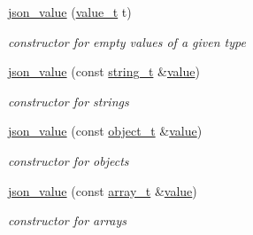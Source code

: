 \begin{DoxyCompactItemize}
\hyperlink{unionnlohmann_1_1basic__json_1_1json__value_a5c2646f7b0007e90ecbf111f2967f7dc}{json\+\_\+value} (\hyperlink{classnlohmann_1_1basic__json_a231b02148577b69a154b2ce2c87a5522}{value\+\_\+t} t)
\begin{DoxyCompactList}\small\item\em constructor for empty values of a given type \end{DoxyCompactList}\item 
\hyperlink{unionnlohmann_1_1basic__json_1_1json__value_a6f4d4d8cce00e9e39980a5d0c6d49565}{json\+\_\+value} (const \hyperlink{classnlohmann_1_1basic__json_ab63e618bbb0371042b1bec17f5891f42}{string\+\_\+t} \&\hyperlink{classnlohmann_1_1basic__json_a0a2cbbd95862a623e7dc5c37e67dead0}{value})
\begin{DoxyCompactList}\small\item\em constructor for strings \end{DoxyCompactList}\item 
\hyperlink{unionnlohmann_1_1basic__json_1_1json__value_ad2de23d77c9f7110149adeb0e10145fe}{json\+\_\+value} (const \hyperlink{classnlohmann_1_1basic__json_a0ac9894c9de8dc551cf2e5f1c605537f}{object\+\_\+t} \&\hyperlink{classnlohmann_1_1basic__json_a0a2cbbd95862a623e7dc5c37e67dead0}{value})
\begin{DoxyCompactList}\small\item\em constructor for objects \end{DoxyCompactList}\item 
\hyperlink{unionnlohmann_1_1basic__json_1_1json__value_a456755d536c2a7f9a9fc95da8b73400d}{json\+\_\+value} (const \hyperlink{classnlohmann_1_1basic__json_ab00b882d39306d663c23dab110f5cae0}{array\+\_\+t} \&\hyperlink{classnlohmann_1_1basic__json_a0a2cbbd95862a623e7dc5c37e67dead0}{value})
\begin{DoxyCompactList}\small\item\em constructor for arrays \end{DoxyCompactList}\end{DoxyCompactItemize}
